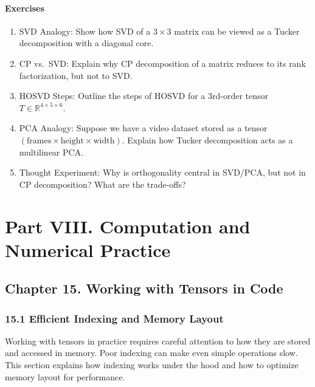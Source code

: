 \documentclass[
  letterpaper,
  DIV=11,
  numbers=noendperiod]{scrreprt}
\begin{document}
\subsubsection{Exercises}\label{exercises-52}

\begin{enumerate}
\def\labelenumi{\arabic{enumi}.}
\item
  SVD Analogy: Show how SVD of a \(3 \times 3\) matrix can be viewed as
  a Tucker decomposition with a diagonal core.
\item
  CP vs.~SVD: Explain why CP decomposition of a matrix reduces to its
  rank factorization, but not to SVD.
\item
  HOSVD Steps: Outline the steps of HOSVD for a 3rd-order tensor
  \(T \in \mathbb{R}^{4 \times 5 \times 6}\).
\item
  PCA Analogy: Suppose we have a video dataset stored as a tensor
  \((\text{frames} \times \text{height} \times \text{width})\). Explain
  how Tucker decomposition acts as a multilinear PCA.
\item
  Thought Experiment: Why is orthogonality central in SVD/PCA, but not
  in CP decomposition? What are the trade-offs?
\end{enumerate}


\chapter{Part VIII. Computation and Numerical
Practice}\label{part-viii.-computation-and-numerical-practice}

\section{Chapter 15. Working with Tensors in
Code}\label{chapter-15.-working-with-tensors-in-code}

\subsection{15.1 Efficient Indexing and Memory
Layout}\label{efficient-indexing-and-memory-layout}

Working with tensors in practice requires careful attention to how they
are stored and accessed in memory. Poor indexing can make even simple
operations slow. This section explains how indexing works under the hood
and how to optimize memory layout for performance.
\end{document}
